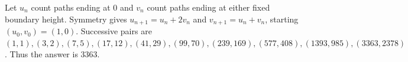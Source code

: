 Let $ u_n $ count paths ending at 0 and $ v_n $ count paths ending at either fixed boundary height. Symmetry gives $ u_{n+1}=u_n+2v_n $ and $ v_{n+1}=u_n+v_n $, starting $(u_0,v_0)=(1,0)$. Successive pairs are $(1,1),(3,2),(7,5),(17,12),(41,29),(99,70),(239,169),(577,408),(1393,985),(3363,2378)$. Thus the answer is $\boxed{3363}$.
